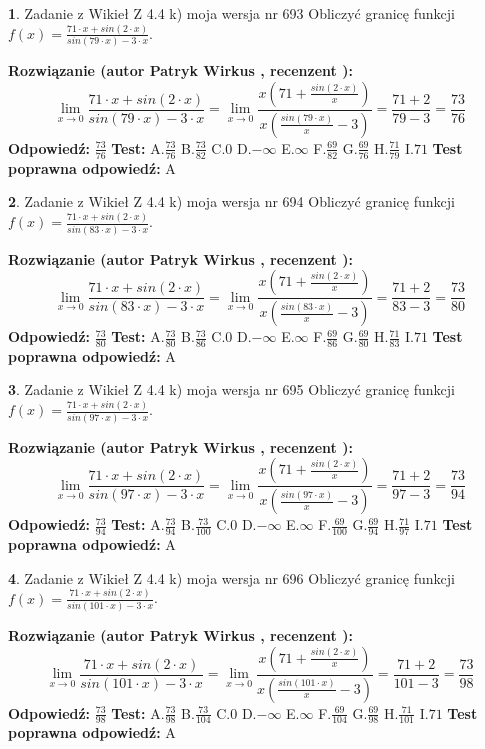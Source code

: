 \documentclass[12pt, a4paper]{article}
\theoremstyle{definition} %
\newtheorem{zad}{}
\newcommand{\zadStart}[1]{\begin{zad}#1\newline}
\newcommand{\zadStop}{\end{zad}}
\newcommand{\rozwStart}[2]{\noindent \textbf{Rozwiązanie (autor #1 , recenzent #2): }\newline}
\newcommand{\rozwStop}{\newline}
\newcommand{\odpStart}{\noindent \textbf{Odpowiedź:}\newline}
\newcommand{\odpStop}{\newline}
\newcommand{\testStart}{\noindent \textbf{Test:}\newline}
\newcommand{\testStop}{\newline}
\newcommand{\kluczStart}{\noindent \textbf{Test poprawna odpowiedź:}\newline}
\newcommand{\kluczStop}{\newline}
\begin{document}
\zadStart{Zadanie z Wikieł Z 4.4 k) moja wersja nr 693}
Obliczyć granicę funkcji $f(x)=\frac{71\cdot x +sin(2\cdot x)}{sin(79\cdot x) -3\cdot x}$.
\zadStop
\rozwStart{Patryk Wirkus}{}
$$\lim\limits_{x\to 0}\frac{71\cdot x +sin(2\cdot x)}{sin(79\cdot x) -3\cdot x}
=\lim\limits_{x\to 0}\frac{x(71+\frac{sin(2\cdot x)}{x})}{x(\frac{sin(79\cdot x)}{x}-3)}
=\frac{71+2}{79-3} = \frac{73}{76}$$
\rozwStop
\odpStart
$\frac{73}{76}$
\odpStop
\testStart
A.$\frac{73}{76}$
B.$\frac{73}{82}$
C.$0$
D.$-\infty$
E.$\infty$
F.$\frac{69}{82}$
G.$\frac{69}{76}$
H.$\frac{71}{79}$
I.$71$
\testStop
\kluczStart
A
\kluczStop



\zadStart{Zadanie z Wikieł Z 4.4 k) moja wersja nr 694}
Obliczyć granicę funkcji $f(x)=\frac{71\cdot x +sin(2\cdot x)}{sin(83\cdot x) -3\cdot x}$.
\zadStop
\rozwStart{Patryk Wirkus}{}
$$\lim\limits_{x\to 0}\frac{71\cdot x +sin(2\cdot x)}{sin(83\cdot x) -3\cdot x}
=\lim\limits_{x\to 0}\frac{x(71+\frac{sin(2\cdot x)}{x})}{x(\frac{sin(83\cdot x)}{x}-3)}
=\frac{71+2}{83-3} = \frac{73}{80}$$
\rozwStop
\odpStart
$\frac{73}{80}$
\odpStop
\testStart
A.$\frac{73}{80}$
B.$\frac{73}{86}$
C.$0$
D.$-\infty$
E.$\infty$
F.$\frac{69}{86}$
G.$\frac{69}{80}$
H.$\frac{71}{83}$
I.$71$
\testStop
\kluczStart
A
\kluczStop



\zadStart{Zadanie z Wikieł Z 4.4 k) moja wersja nr 695}
Obliczyć granicę funkcji $f(x)=\frac{71\cdot x +sin(2\cdot x)}{sin(97\cdot x) -3\cdot x}$.
\zadStop
\rozwStart{Patryk Wirkus}{}
$$\lim\limits_{x\to 0}\frac{71\cdot x +sin(2\cdot x)}{sin(97\cdot x) -3\cdot x}
=\lim\limits_{x\to 0}\frac{x(71+\frac{sin(2\cdot x)}{x})}{x(\frac{sin(97\cdot x)}{x}-3)}
=\frac{71+2}{97-3} = \frac{73}{94}$$
\rozwStop
\odpStart
$\frac{73}{94}$
\odpStop
\testStart
A.$\frac{73}{94}$
B.$\frac{73}{100}$
C.$0$
D.$-\infty$
E.$\infty$
F.$\frac{69}{100}$
G.$\frac{69}{94}$
H.$\frac{71}{97}$
I.$71$
\testStop
\kluczStart
A
\kluczStop



\zadStart{Zadanie z Wikieł Z 4.4 k) moja wersja nr 696}
Obliczyć granicę funkcji $f(x)=\frac{71\cdot x +sin(2\cdot x)}{sin(101\cdot x) -3\cdot x}$.
\zadStop
\rozwStart{Patryk Wirkus}{}
$$\lim\limits_{x\to 0}\frac{71\cdot x +sin(2\cdot x)}{sin(101\cdot x) -3\cdot x}
=\lim\limits_{x\to 0}\frac{x(71+\frac{sin(2\cdot x)}{x})}{x(\frac{sin(101\cdot x)}{x}-3)}
=\frac{71+2}{101-3} = \frac{73}{98}$$
\rozwStop
\odpStart
$\frac{73}{98}$
\odpStop
\testStart
A.$\frac{73}{98}$
B.$\frac{73}{104}$
C.$0$
D.$-\infty$
E.$\infty$
F.$\frac{69}{104}$
G.$\frac{69}{98}$
H.$\frac{71}{101}$
I.$71$
\testStop
\kluczStart
A
\kluczStop
\end{document}
